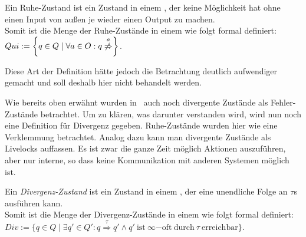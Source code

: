 \begin{Def}
  Ein Ruhe-Zustand ist ein Zustand in einem \EIO{}, der keine Möglichkeit hat
  ohne einen Input von außen je wieder einen Output zu machen.\\
  Somit ist die Menge der Ruhe-Zustände in einem \EIO{} wie folgt formal
  definiert: $Qui:=\left\{q\in Q\mid \forall a\in O: q
  \overset{a}{\not{\hspace{-0.1cm}\Rightarrow}}\right\}$.
\end{Def}

Diese Art der Definition hätte jedoch die Betrachtung deutlich aufwendiger
gemacht und soll deshalb hier nicht behandelt werden.

Wie bereits oben erwähnt wurden in~\cite{Chilton2013} auch noch divergente
Zustände als Fehler-Zustände betrachtet. Um zu klären, was darunter verstanden
wird, wird nun noch eine Definition für Divergenz gegeben. Ruhe-Zustände wurden
hier wie eine Verklemmung betrachtet. Analog dazu kann man divergente Zustände
als Livelocks auffassen. Es ist zwar die ganze Zeit möglich Aktionen
auszuführen, aber nur interne, so dass keine Kommunikation mit anderen Systemen
möglich ist.

\begin{Def}[Divergenz]
  Ein \emph{Divergenz-Zustand} ist ein Zustand in einem \EIO{}, der eine
  unendliche Folge an $\tau$s ausführen kann.\\
  Somit ist die Menge der Divergenz-Zustände in einem \EIO{} wie folgt formal
  definiert: $Div := \{q\in Q\mid \exists q'\in Q': q
  \overset{\tau}{\Rightarrow} q' \wedge q'~\mathrm{ist}~\infty\mathrm{-oft}
  ~\mathrm{durch}~\tau ~\mathrm{erreichbar}\}$.
\end{Def}
